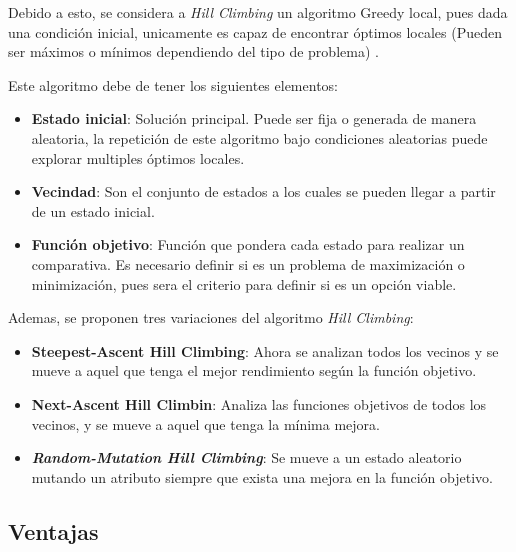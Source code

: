\documentclass[12pt,twoside]{article}
\begin{document}
	Debido a esto, se considera a \textit{Hill Climbing} un algoritmo Greedy local, pues dada una condición inicial, unicamente es capaz de encontrar óptimos locales (Pueden ser máximos o mínimos dependiendo del tipo de problema) \cite{HC}.
	
	Este algoritmo debe de tener los siguientes elementos:
	\begin{itemize}
		\item \textbf{Estado inicial}: Solución principal. Puede ser fija o generada de manera aleatoria, la repetición de este algoritmo bajo condiciones aleatorias puede explorar multiples óptimos locales.
		\item \textbf{Vecindad}: Son el conjunto de estados a los cuales se pueden llegar a partir de un estado inicial.
		\item  \textbf{Función objetivo}: Función que pondera cada estado para realizar un comparativa. Es necesario definir si es un problema de maximización o minimización, pues sera el criterio para definir si es un opción viable. 
	\end{itemize}
	
	Ademas, se proponen tres variaciones del algoritmo \textit{Hill Climbing}:
	\begin{itemize}
		\item \textbf{Steepest-Ascent Hill Climbing}: Ahora se analizan todos los vecinos y se mueve a aquel que tenga el mejor rendimiento según la función objetivo.
		\item \textbf{Next-Ascent Hill Climbin}: Analiza las funciones objetivos de todos los vecinos, y se mueve a aquel que tenga la mínima mejora.
		\item \textit{\textbf{Random-Mutation Hill Climbing}}: Se mueve a un estado aleatorio mutando un atributo siempre que exista una mejora en la función objetivo.
	\end{itemize}
	
	
	\subsection{Ventajas}
	
\end{document}
